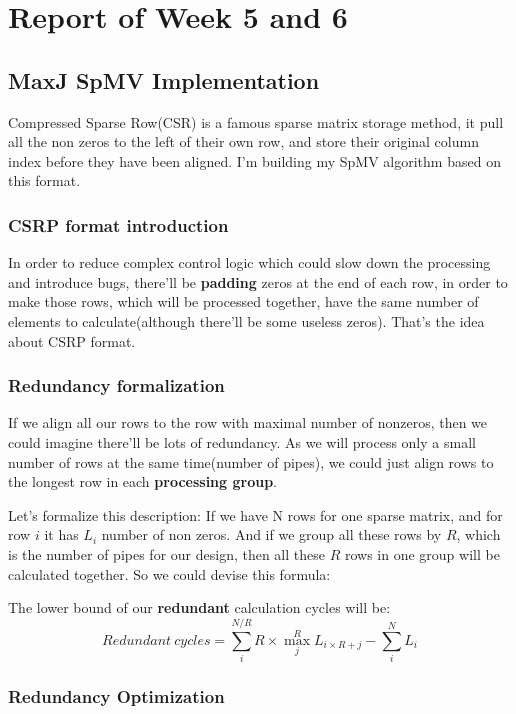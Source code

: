 
\section{Report of Week 5 and 6}
\subsection{MaxJ SpMV Implementation}

Compressed Sparse Row(CSR) is a famous sparse matrix storage method, it pull all the non zeros to the left of their own row, and store their original column index before they have been aligned. I'm building my SpMV algorithm based on this format. 

\subsubsection{CSRP format introduction}
In order to reduce complex control logic which could slow down the processing and introduce bugs, there'll be \textbf{padding} zeros at the end of each row, in order to make those rows, which will be processed together, have the same number of elements to calculate(although there'll be some useless zeros). That's the idea about CSRP format.

\subsubsection{Redundancy formalization}

If we align all our rows to the row with maximal number of nonzeros, then we could imagine there'll be lots of redundancy. As we will process only a small number of rows at the same time(number of pipes), we could just align rows to the longest row in each \textbf{processing group}.

Let's formalize this description: If we have N rows for one sparse matrix, and for row $i$ it has $L_i$ number of non zeros. And if we group all these rows by $R$, which is the number of pipes for our design, then all these $R$ rows in one group will be calculated together. So we could devise this formula:

The lower bound of our \textbf{redundant} calculation cycles will be:
\begin{equation}
Redundant\ cycles = \sum_{i}^{N/R} R \times \max_{j}^{R} L_{i\times R + j} - \sum_{i}^{N} L_i
\end{equation}

\subsubsection{Redundancy Optimization}


